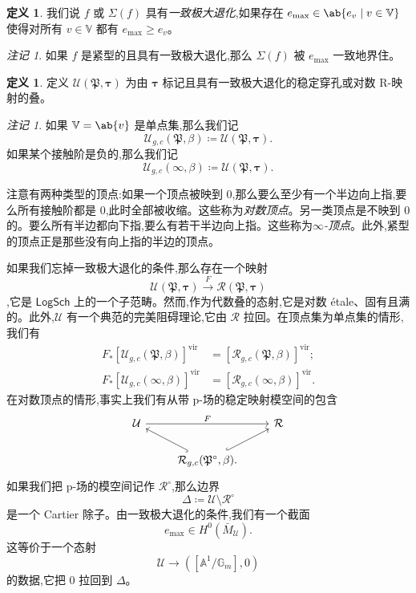 \documentclass{amsart}
\theoremstyle{definition}
\newtheorem{defn}[thm]{定义}
\theoremstyle{remark}
\newtheorem{rmk}[thm]{注记}
\theoremstyle{plain}
\theoremstyle{definition}
\theoremstyle{remark}
\newcommand{\A}{\mathbb{A}}
\newcommand{\G}{\mathbb{G}}
\newcommand{\V}{\mathbb{V}}
\newcommand{\mc}[1]{\mathcal{#1}}
\newcommand{\mf}[1]{\mathfrak{#1}}
\newcommand{\mr}[1]{\mathrm{#1}}
\newcommand{\ms}[1]{\mathsf{#1}}
\newcommand{\1}{\mathbf{1}}
\newcommand{\2}{\mathbf{2}}
\newcommand{\3}{\mathbf{3}}
\newcommand{\vir}{\mr{vir}}
\begin{document}
\begin{defn}
    我们说 \(f\) 或 \(\Sigma(f)\) 具有\textit{一致极大退化},如果存在 \(e_{\max} \in \ab\{e_v \mid v \in \V \}\) 使得对所有 \(v \in \V\) 都有 \(e_{\max} \geq e_v\)。
\end{defn}

\begin{rmk}
    如果 \(f\) 是紧型的且具有一致极大退化,那么 \(\Sigma(f)\) 被 \(e_{\max}\) 一致地界住。
\end{rmk}

\begin{defn}
    定义 \(\mc{U}(\mf{P}, \bm{\tau})\) 为由 \(\bm{\tau}\) 标记且具有一致极大退化的稳定穿孔或对数 R-映射的叠。
\end{defn}

\begin{rmk}
    如果 \(\V = \ab\{v\}\) 是单点集,那么我们记
    \[ \mc{U}_{g, c}(\mf{P}, \beta) \coloneqq \mc{U}(\mf{P}, \bm{\tau}). \]
    如果某个接触阶是负的,那么我们记
    \[ \mc{U}_{g, c}(\infty, \beta) \coloneqq \mc{U}(\mf{P}, \bm{\tau}). \]
\end{rmk}

注意有两种类型的顶点:如果一个顶点被映到 \(0\),那么要么至少有一个半边向上指,要么所有接触阶都是 \(0\),此时全部被收缩。这些称为\textit{对数顶点}。另一类顶点是不映到 \(0\) 的。要么所有半边都向下指,要么有若干半边向上指。这些称为\textit{\(\infty\)-顶点}。此外,紧型的顶点正是那些没有向上指的半边的顶点。

如果我们忘掉一致极大退化的条件,那么存在一个映射
\[ \mc{U}(\mf{P}, \bm{\tau}) \xrightarrow{F} \mc{R}(\mf{P}, \bm{\tau}) \]
,它是 \(\ms{LogSch}\) 上的一个子范畴。然而,作为代数叠的态射,它是对数 \'etale、固有且满的。此外,\(\mc{U}\) 有一个典范的完美阻碍理论,它由 \(\mc{R}\) 拉回。在顶点集为单点集的情形,我们有
\begin{align*}
    F_* [\mc{U}_{g, c}(\mf{P}, \beta)]^{\vir} &= [\mc{R}_{g, c}(\mf{P}, \beta)]^{\vir}; \\
    F_* [\mc{U}_{g, c}(\infty, \beta)]^{\vir} &= [\mc{R}_{g, c}(\infty, \beta)]^{\vir}.
\end{align*}
在对数顶点的情形,事实上我们有从带 p-场的稳定映射模空间的包含
\begin{equation*}
\begin{tikzcd}
    \mc{U} \ar{rr}{F} & & \mc{R} \\
    & \mc{R}_{g,c}(\mf{P}^{\circ}, \beta) \ar[hookrightarrow]{ul} \ar[hookrightarrow]{ur}.
\end{tikzcd}
\end{equation*}
如果我们把 p-场的模空间记作 \(\mc{R}^{\circ}\),那么边界
\[ \Delta \coloneqq \mc{U} \setminus \mc{R}^{\circ} \]
是一个 Cartier 除子。由一致极大退化的条件,我们有一个截面
\[ e_{\max} \in H^0(\bar{M}_{\mc{U}}). \]
这等价于一个态射
\[ \mc{U} \to ([\A^1/\G_m], 0) \]
的数据,它把 \(0\) 拉回到 \(\Delta\)。
\end{document}
